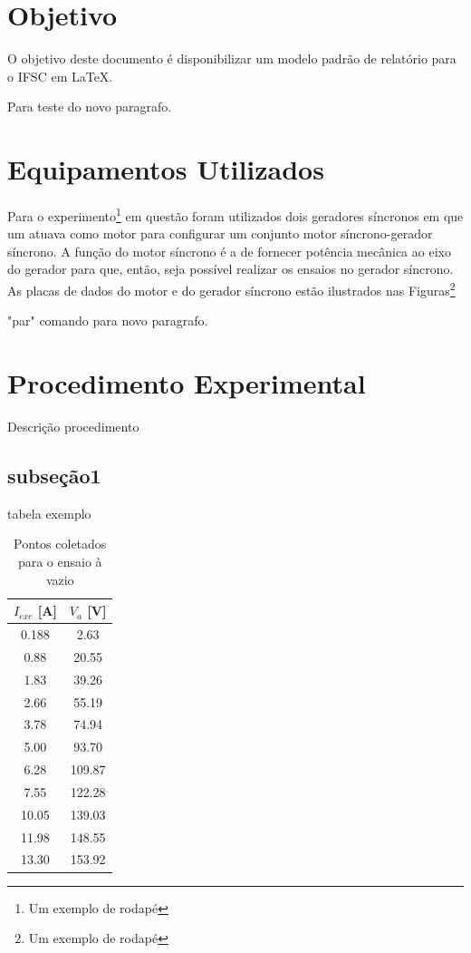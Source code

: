 \documentclass[a4paper, 12pt]{article}
\begin{document}
\newpage
{}
\section{Objetivo}
O objetivo deste documento é disponibilizar um modelo padrão de relatório para o IFSC em \LaTeX.
\par Para teste do novo paragrafo.

\section{Equipamentos Utilizados} 

Para o experimento\footnote{Um exemplo de rodapé} em questão foram utilizados dois geradores síncronos em que um atuava como motor para configurar um conjunto motor síncrono-gerador síncrono. A função do motor síncrono é a de fornecer potência mecânica ao eixo do gerador para que, então, seja possível realizar os ensaios no gerador síncrono. As placas de dados do motor e do gerador síncrono estão ilustrados nas Figuras\footnote{Um exemplo de rodapé}
\par "par" comando para novo paragrafo.


\section{Procedimento Experimental}

Descrição procedimento


 \subsection{subseção1}
  tabela exemplo
  

\begin{table}[htb]
\centering
\begin{tabular}{c|c}
$I_{exc}$ [A] & $V_{a}$ [V] \\ \hline
0.188	& 2.63 		\\\hline
0.88 & 20.55	\\\hline
1.83 & 39.26 \\\hline
2.66 & 55.19 \\\hline
3.78 & 74.94 \\\hline
5.00 & 93.70 \\\hline
6.28 & 109.87 \\\hline
7.55 & 122.28 \\\hline
10.05 & 139.03 \\\hline
11.98 & 148.55 \\\hline
13.30 & 153.92 

\end{tabular}
\caption{Pontos coletados para o ensaio à vazio}
\label{PTO:col_vazio}
\end{table}
\end{document}
